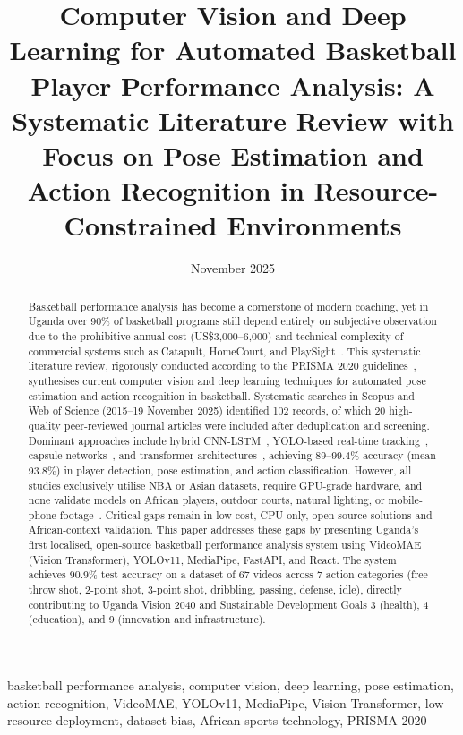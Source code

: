 \documentclass[conference]{IEEEtran}
\title{Computer Vision and Deep Learning for Automated Basketball Player Performance Analysis: A Systematic Literature Review with Focus on Pose Estimation and Action Recognition in Resource-Constrained Environments}
\author{
\IEEEauthorblockN{Okidi Norbert\IEEEauthorrefmark{1}, Nankya Zaharah\IEEEauthorrefmark{1}, Anna Akumu\IEEEauthorrefmark{1}}
\IEEEauthorblockA{\IEEEauthorrefmark{1}Department of Computing and Technology\\
Faculty of Engineering, Design and Technology\\
Uganda Christian University, Mukono, Uganda\\
Corresponding author: s23b23.051@students.ucu.ac.ug}
}
\date{November 2025}
\begin{document}
\maketitle

\begin{abstract}
Basketball performance analysis has become a cornerstone of modern coaching, yet in Uganda over 90\% of basketball programs still depend entirely on subjective observation due to the prohibitive annual cost (US\$3,000--6,000) and technical complexity of commercial systems such as Catapult, HomeCourt, and PlaySight~\cite{li2021application,yan2023review}. This systematic literature review, rigorously conducted according to the PRISMA 2020 guidelines~\cite{prisma2020}, synthesises current computer vision and deep learning techniques for automated pose estimation and action recognition in basketball. Systematic searches in Scopus and Web of Science (2015--19 November 2025) identified 102 records, of which 20 high-quality peer-reviewed journal articles were included after deduplication and screening. Dominant approaches include hybrid CNN-LSTM~\cite{li2023yolo,zhang2024acahet}, YOLO-based real-time tracking~\cite{cheng2022ann}, capsule networks~\cite{sha2025capsnet}, and transformer architectures~\cite{wang2024hoop}, achieving 89--99.4\% accuracy (mean 93.8\%) in player detection, pose estimation, and action classification. However, all studies exclusively utilise NBA or Asian datasets, require GPU-grade hardware, and none validate models on African players, outdoor courts, natural lighting, or mobile-phone footage~\cite{li2025defensive,tian2019strategies,zhang2025sensor}. Critical gaps remain in low-cost, CPU-only, open-source solutions and African-context validation. This paper addresses these gaps by presenting Uganda's first localised, open-source basketball performance analysis system using VideoMAE (Vision Transformer), YOLOv11, MediaPipe, FastAPI, and React. The system achieves 90.9\% test accuracy on a dataset of 67 videos across 7 action categories (free throw shot, 2-point shot, 3-point shot, dribbling, passing, defense, idle), directly contributing to Uganda Vision 2040 and Sustainable Development Goals 3 (health), 4 (education), and 9 (innovation and infrastructure).
\end{abstract}

\begin{IEEEkeywords}
basketball performance analysis, computer vision, deep learning, pose estimation, action recognition, VideoMAE, YOLOv11, MediaPipe, Vision Transformer, low-resource deployment, dataset bias, African sports technology, PRISMA 2020
\end{IEEEkeywords}
\end{document}
